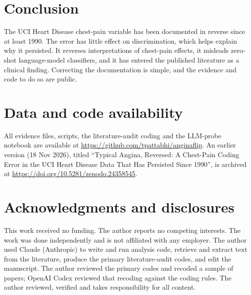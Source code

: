 \documentclass[11pt]{article}
\begin{document}
\section{Conclusion}

The UCI Heart Disease chest-pain variable has been documented in reverse since at least 1990. The error has little effect on discrimination, which helps explain why it persisted. It reverses interpretations of chest-pain effects, it misleads zero-shot language-model classifiers, and it has entered the published literature as a clinical finding. Correcting the documentation is simple, and the evidence and code to do so are public.

\section*{Data and code availability}
All evidence files, scripts, the literature-audit coding and the LLM-probe notebook are available at \url{https://github.com/tpattabhi/anginaflip}. An earlier version (18 Nov 2026), titled ``Typical Angina, Reversed: A Chest-Pain Coding Error in the UCI Heart Disease Data That Has Persisted Since 1990'', is archived at \url{https://doi.org/10.5281/zenodo.24358545}.

\section*{Acknowledgments and disclosures}
This work received no funding. The author reports no competing interests. The work was done independently and is not affiliated with any employer. The author used Claude (Anthropic) to write and run analysis code, retrieve and extract text from the literature, produce the primary literature-audit codes, and edit the manuscript. The author reviewed the primary codes and recoded a sample of papers; OpenAI Codex reviewed that recoding against the coding rules. The author reviewed, verified and takes responsibility for all content.



\end{document}
